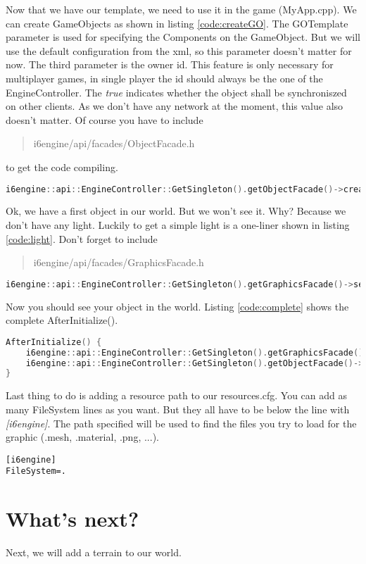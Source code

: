 \documentclass{article}
\begin{document}
Now that we have our template, we need to use it in the game (MyApp.cpp). We can create GameObjects as shown in listing \ref{code:createGO}. The GOTemplate parameter is used for specifying the Components on the GameObject. But we will use the default configuration from the xml, so this parameter doesn't matter for now. The third parameter is the owner id. This feature is only necessary for multiplayer games, in single player the id should always be the one of the EngineController. The \textit{true} indicates whether the object shall be synchroniszed on other clients. As we don't have any network at the moment, this value also doesn't matter. Of course you have to include \begin{quote}i6engine/api/facades/ObjectFacade.h\end{quote} to get the code compiling.
\begin{lstlisting}[language=C++, style=basic, caption={creating objects}, label=code:createGO]
i6engine::api::EngineController::GetSingleton().getObjectFacade()->createObject("Tutorial", i6engine::api::objects::GOTemplate(), i6engine::api::EngineController::GetSingleton().getUuid(), true);
\end{lstlisting}
Ok, we have a first object in our world. But we won't see it. Why? Because we don't have any light. Luckily to get a simple light is a one-liner shown in listing \ref{code:light}. Don't forget to include \begin{quote}i6engine/api/facades/GraphicsFacade.h\end{quote}
\begin{lstlisting}[language=C++, style=basic, caption={adding lights}, label=code:light]
i6engine::api::EngineController::GetSingleton().getGraphicsFacade()->setAmbientLight(1.0, 1.0, 1.0);
\end{lstlisting}
Now you should see your object in the world. Listing \ref{code:complete} shows the complete AfterInitialize().
\begin{lstlisting}[language=C++, style=basic, caption={AfterInitialize()}, label=code:complete]
AfterInitialize() {
	i6engine::api::EngineController::GetSingleton().getGraphicsFacade()->setAmbientLight(1.0, 1.0, 1.0);
	i6engine::api::EngineController::GetSingleton().getObjectFacade()->createObject("Tutorial", i6engine::api::objects::GOTemplate(), i6engine::api::EngineController::GetSingleton().getUuid(), true);
}
\end{lstlisting}

Last thing to do is adding a resource path to our resources.cfg. You can add as many FileSystem lines as you want. But they all have to be below the line with \textit{[i6engine]}. The path specified will be used to find the files you try to load for the graphic (.mesh, .material, .png, ...).
\begin{lstlisting}[style=basic, caption={resource.cfg}, label=code:resourcecfg]
[i6engine]
FileSystem=.
\end{lstlisting}

\section{What's next?}

Next, we will add a terrain to our world.
\end{document}
